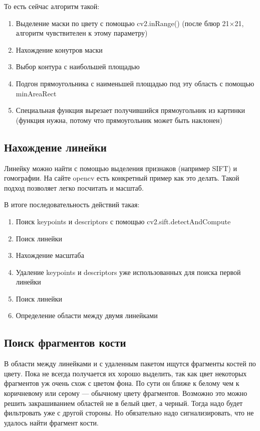 \documentclass[a4paper]{article}
\begin{document}
То есть сейчас алгоритм такой:


\begin{enumerate}
	\item Выделение маски по цвету с помощью cv2.inRange() (после блюр 21$\times$21, алгоритм чувствителен к этому параметру)
	\item Нахождение конутров маски
	\item Выбор контура с наибольшей площадью
	\item Подгон прямоугольника с наименьшей площадью под эту область с помощью minAreaRect
	\item Специальная функция вырезает получившийся прямоугольник из картинки (функция нужна, потому что прямоугольник может быть наклонен) 
\end{enumerate}


\subsection{Нахождение линейки}
Линейку можно найти с помощью выделения признаков (например SIFT) и гомографии. На сайте opencv есть конкретный пример как это делать. Такой подход позволяет легко посчитать и масштаб.

В итоге последовательность действий такая:

\begin{enumerate}
	\item Поиск keypoints и descriptors с помощью cv2.sift.detectAndCompute
	\item Поиск линейки
	\item Нахождение масштаба
	\item Удаление keypoints и descriptors уже использованных для поиска первой линейки
	\item Поиск линейки
	\item Определение области между двумя линейками
\end{enumerate}


\subsection{Поиск фрагментов кости}
В области между линейками и с удаленным пакетом ищутся фрагменты костей по цвету. Пока не всегда получается их хорошо выделить, так как цвет некоторых фрагментов уж очень схож с цветом фона. По сути он ближе к белому чем к коричневому или серому --- обычному цвету фрагментов. Возможно это можно решить закрашиванием областей не в белый цвет, а черный. Тогда надо будет фильтровать уже с другой стороны. Но обязательно надо сигнализировать, что не удалось найти фрагмент кости.
\end{document}

